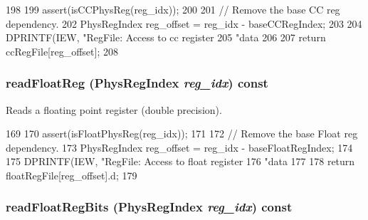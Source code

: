 \begin{DoxyCode}
198     {
199         assert(isCCPhysReg(reg_idx));
200 
201         // Remove the base CC reg dependency.
202         PhysRegIndex reg_offset = reg_idx - baseCCRegIndex;
203 
204         DPRINTF(IEW, "RegFile: Access to cc register %
205                 "data %
206 
207         return ccRegFile[reg_offset];
208     }
\end{DoxyCode}
\hypertarget{classPhysRegFile_a43267ea98fb72ca0b1aa7dedc37cc571}{
\subsubsection[{readFloatReg}]{ readFloatReg ({\bf PhysRegIndex} {\em reg\_\-idx}) const}}
\label{classPhysRegFile_a43267ea98fb72ca0b1aa7dedc37cc571}
Reads a floating point register (double precision). 


\begin{DoxyCode}
169     {
170         assert(isFloatPhysReg(reg_idx));
171 
172         // Remove the base Float reg dependency.
173         PhysRegIndex reg_offset = reg_idx - baseFloatRegIndex;
174 
175         DPRINTF(IEW, "RegFile: Access to float register %
176                 "data %
177 
178         return floatRegFile[reg_offset].d;
179     }
\end{DoxyCode}
\hypertarget{classPhysRegFile_a8fd79275783cdb4121866e3aee43c839}{
\subsubsection[{readFloatRegBits}]{ readFloatRegBits ({\bf PhysRegIndex} {\em reg\_\-idx}) const}}
\label{classPhysRegFile_a8fd79275783cdb4121866e3aee43c839}



